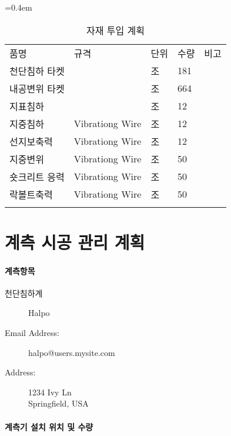 \documentclass[12pt, a4paper, oneside]{book}
\let\stdsection\section
\renewcommand\section{\newpage\stdsection}
\begin{document}
			\begin{table} [h]
	
			\caption{자재 투입 계획} 
			\label{tab:title} 
	
			\begin{center}
			\tabulinesep=0.4em
			\begin{tabu} to 1.0\linewidth { X[1.4,r] X[1.4,l] X[0.6,c] X[c] X[0.6,c] }
			\tabucline [1pt,] {-}
			품명			&규격				&단위		&수량		&비고\\
			\tabucline [0.1pt,] {-}
			천단침하 타켓	&					&조			&181		&\\
			내공변위 타켓	&					&조			&664		&\\
			지표침하		&					&조			&12			&\\
			지중침하		&Vibrationg Wire	&조			&12			&\\
			선지보축력		&Vibrationg Wire	&조			&12			&\\
			지중변위		&Vibrationg Wire	&조			&50			&\\
			숏크리트 응력	&Vibrationg Wire	&조			&50			&\\
			락볼트축력		&Vibrationg Wire	&조			&50			&\\
			\tabucline [0.1pt,] {-}
			\end{tabu} 
			\end{center}
			\end{table}
		




	\section{계측 시공 관리 계획}

		\paragraph{계측항목}


		\begin{description}
		\item[천단침하계]  Halpo
		\item[Email Address:] halpo@users.mysite.com
		\item[Address:]  1234 Ivy Ln \\ Springfield, USA
		\end{description}
		
		\paragraph{계측기 설치 위치 및 수량}
		
\end{document}
